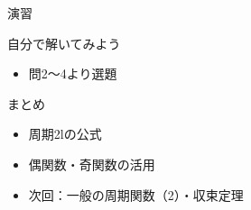 \documentclass[aspectratio=43,professionalfonts,handout]{beamer}
\begin{document}
\begin{frame}{演習}
  \begin{exampleblock}{自分で解いてみよう}
  \begin{itemize}
    \item 問2〜4より選題
  \end{itemize}
  \end{exampleblock}
\end{frame}

\begin{frame}{まとめ}
  \begin{itemize}
    \item 周期2lの公式
    \item 偶関数・奇関数の活用
    \item 次回：一般の周期関数（2）・収束定理
  \end{itemize}
\end{frame}
\end{document}

